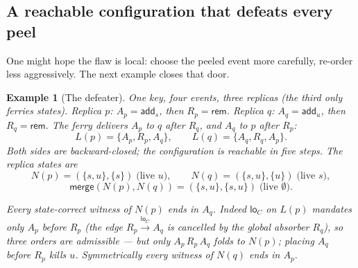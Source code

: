 \documentclass[11pt]{article}
\newtheorem{example}[theorem]{Example}
\newcommand{\loC}{\xrightarrow{\mathsf{lo}_{C}}}
\newcommand{\add}{\mathsf{add}}
\newcommand{\rem}{\mathsf{rem}}
\newcommand{\Merge}{\mathsf{merge}}
\begin{document}
\subsection{A reachable configuration that defeats every peel}

One might hope the flaw is local: choose the peeled event more carefully,
re-order less aggressively. The next example closes that door.

\begin{example}[The defeater]
\label{ex:defeater}
One key, four events, three replicas (the third only ferries states).
Replica $p$: $A_p = \add_s$, then $R_p = \rem$. Replica $q$:
$A_q = \add_u$, then $R_q = \rem$. The ferry delivers $A_p$ to $q$
\emph{after} $R_q$, and $A_q$ to $p$ \emph{after} $R_p$:
\[
L(p) = \{A_p, R_p, A_q\}, \qquad L(q) = \{A_q, R_q, A_p\}.
\]
Both sides are backward-closed; the configuration is reachable in five
steps. The replica states are
\[
N(p) = (\{s,u\}, \{s\}) \;\text{(live } u\text{)}, \qquad
N(q) = (\{s,u\}, \{u\}) \;\text{(live } s\text{)},
\]
\[
\Merge(N(p),N(q)) = (\{s,u\},\{s,u\}) \;\text{(live } \emptyset\text{)}.
\]

\begin{center}
\end{center}

\emph{Every state-correct witness of $N(p)$ ends in $A_q$.} Indeed
$\mathsf{lo}_C$ on $L(p)$ mandates only $A_p$ before $R_p$ (the edge
$R_p \loC A_q$ is cancelled by the global absorber $R_q$), so three
orders are admissible --- but only $A_p\, R_p\, A_q$ folds to $N(p)$;
placing $A_q$ before $R_p$ kills $u$. Symmetrically every witness of
$N(q)$ ends in $A_p$.


\end{example}
\end{document}
